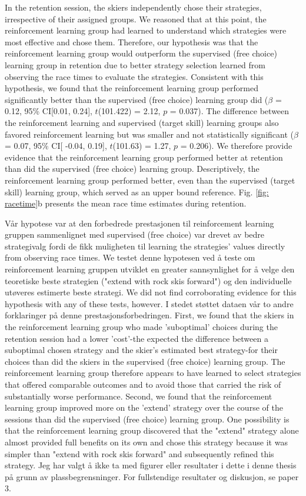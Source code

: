 In the retention session, the skiers independently chose their strategies, irrespective of their assigned groups. We reasoned that at this point, the reinforcement learning group had learned to understand which strategies were most effective and chose them. Therefore, our hypothesis was that the reinforcement learning group would outperform the supervised (free choice) learning group in retention due to better strategy selection learned from observing the race times to evaluate the strategies. Consistent with this hypothesis, we found that the reinforcement learning group performed significantly better than the supervised (free choice) learning group did ($\beta$ = 0.12, 95\% CI[0.01, 0.24], $t$(101.422) = 2.12, $p$ = 0.037). The difference between the reinforcement learning and supervised (target skill) learning groups also favored reinforcement learning but was smaller and not statistically significant  ($\beta$ = 0.07, 95\% CI[ -0.04, 0.19], $t$(101.63) = 1.27, $p$ = 0.206). We therefore provide evidence that the reinforcement learning group performed better at retention than did the supervised (free choice) learning group. Descriptively, the reinforcement learning group performed better, even than the supervised (target skill) learning group, which served as an upper bound reference. Fig. \ref{fig: racetime}b presents the mean race time estimates during retention. 

Vår hypotese var at den forbedrede prestasjonen til reinforcement learning gruppen sammenlignet med supervised (free choice) var drevet av bedre strategivalg fordi de fikk muligheten til learning the strategies' values directly from observing race times. We testet denne hypotesen ved å teste om reinforcement learning gruppen utviklet en greater sannsynlighet for å velge den teoretiske beste strategien ("extend with rock skis forward") og den individuelle utøveres estimerte beste strategi. We did not find corroborating evidence for this hypothesis with any of these tests, however. I stedet støttet dataen vår to andre forklaringer på denne prestasjonsforbedringen. First, we found that the skiers in the reinforcement learning group who made 'suboptimal' choices during the retention session had a lower 'cost'-the expected the difference between a suboptimal chosen strategy and the skier's estimated best strategy-for their choices than did the skiers in the supervised (free choice) learning group. The reinforcement learning group therefore appears to have learned to select strategies that offered comparable outcomes and to avoid those that carried the risk of substantially worse performance. Second, we found that the reinforcement learning group improved more on the 'extend' strategy over the course of the sessions than did the supervised (free choice) learning group. One possibility is that the reinforcement learning group discovered that the "extend" strategy alone almost provided full benefits on its own and chose this strategy because it was simpler than "extend with rock skis forward" and subsequently refined this strategy. Jeg har valgt å ikke ta med figurer eller resultater i dette i denne thesis på grunn av plassbegrensninger. For fullstendige resultater og diskusjon, se paper 3. 


